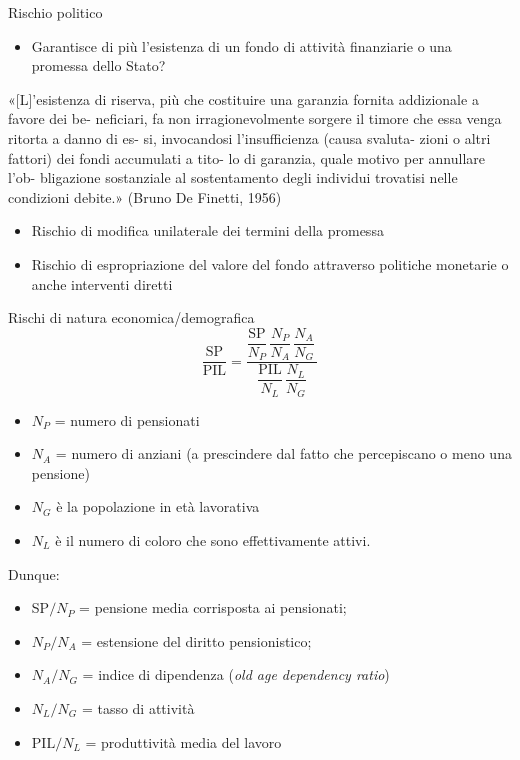 \documentclass[11pt]{beamer}
\begin{document}
\begin{frame}{Rischio politico}
\begin{itemize}
\item Garantisce di più l'esistenza di un fondo di attività finanziarie o una promessa dello Stato?
\end{itemize}

\begin{quoting}
«[L]’esistenza di riserva, più che costituire una
garanzia fornita addizionale a favore dei be-
neficiari, fa non irragionevolmente sorgere il
timore che essa venga ritorta a danno di es-
si, invocandosi l’insufficienza (causa svaluta-
zioni o altri fattori) dei fondi accumulati a tito-
lo di garanzia, quale motivo per annullare l’ob-
bligazione sostanziale al sostentamento degli
individui trovatisi nelle condizioni debite.» (Bruno De Finetti, 1956)
\end{quoting}

\begin{itemize}
\item Rischio di modifica unilaterale dei termini della promessa
\item Rischio di espropriazione del valore del fondo attraverso politiche monetarie o anche interventi diretti
\end{itemize}
\end{frame}

\begin{frame}{Rischi di natura economica/demografica}
\begin{equation*}\label{eq:spesa-pil-scomposizione}
  \frac{\text{SP}}{\text{PIL}} =\frac{\dfrac{\text{SP}}{N_P}\,\dfrac{N_P}{N_A}\,\dfrac{N_A}{N_G}\,}
  {\dfrac{\text{PIL}}{N_L}\,\dfrac{N_L}{N_G}}
\end{equation*}

\begin{itemize}
\item \(N_P\) = numero di pensionati
\item \(N_A\) = numero di anziani (a prescindere dal fatto che percepiscano o meno una pensione)
\item \(N_G\) è la popolazione in età lavorativa
\item \(N_L\) è il numero di coloro che sono effettivamente attivi.
\end{itemize}
Dunque:
\begin{itemize}
\item SP\(/N_P\) = pensione media corrisposta ai pensionati;
\item \(N_P/N_A\) = estensione del diritto pensionistico;
\item \(N_A/N_G\) = indice di dipendenza (\emph{old age dependency ratio})
\item \(N_L/N_G\) = tasso di attività
\item \(\text{PIL}/N_L\) = produttività media del lavoro
\end{itemize}
\end{frame}
\end{document}
